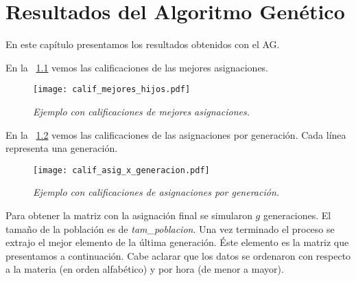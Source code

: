\chapter{Resultados del Algoritmo Genético}

En este capítulo presentamos los resultados obtenidos con el AG.

En la \figurename{~\ref{EjcalifMejoresHijos}} vemos las calificaciones de las mejores asignaciones.

\begin{figure}[H]
\centering
\texttt{[image: calif\_mejores\_hijos.pdf]} %
\caption{\textit{Ejemplo con calificaciones de mejores asignaciones.}}\label{EjcalifMejoresHijos}
\end{figure}

%

En la \figurename{~\ref{EjcalifAsig_x_generacion}} vemos las calificaciones de las asignaciones por generación. Cada línea representa una generación.

\begin{figure}[H]
\centering
\texttt{[image: calif\_asig\_x\_generacion.pdf]} %
\caption{\textit{Ejemplo con calificaciones de asignaciones por generación.}}\label{EjcalifAsig_x_generacion}
\end{figure}


Para obtener la matriz con la asignación final se simularon $g$ generaciones. El tamaño de la población es de \textit{tam\_poblacion}. Una vez terminado el proceso se extrajo el mejor elemento de la última generación. Éste elemento es la matriz que presentamos a continuación. Cabe aclarar que los datos se ordenaron con respecto a la materia (en orden alfabético) y por hora (de menor a mayor).

\dfNmatAsigFinal
